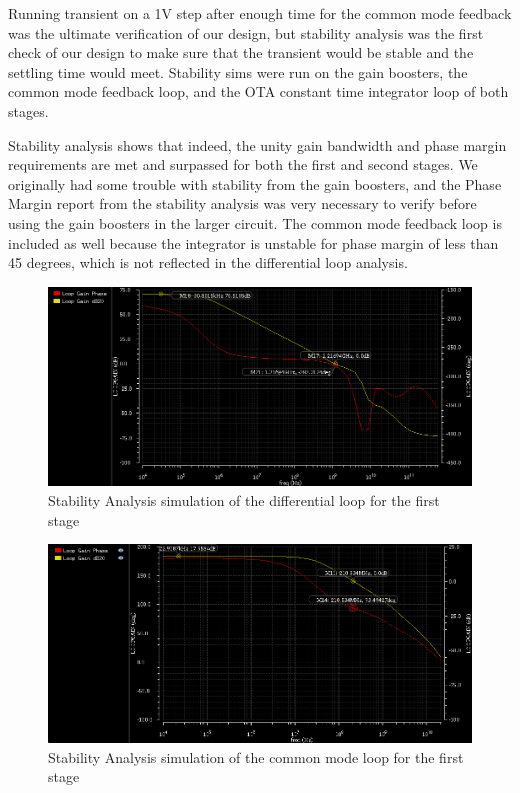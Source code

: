 \documentclass[conference]{IEEEtran}
\begin{document}
Running transient on a 1V step after enough time for the common mode feedback was the ultimate verification of our design, but stability analysis was the first check of our design to make sure that the transient would be stable and the settling time would meet. Stability sims were run on the gain boosters, the common mode feedback loop, and the OTA constant time integrator loop of both stages.

Stability analysis shows that indeed, the unity gain bandwidth and phase margin requirements are met and surpassed for both the first and second stages. We originally had some trouble with stability from the gain boosters, and the Phase Margin report from the stability analysis was very necessary to verify before using the gain boosters in the larger circuit. The common mode feedback loop is included as well because the integrator is unstable for phase margin of less than 45 degrees, which is not reflected in the differential loop analysis.\\


\begin{figure}[h]
\centering
\includegraphics[width=\linewidth]{piktures/st1_diff_ac}
\caption{Stability Analysis simulation of the differential loop for the first stage}
\label{stage1-tran}
\end{figure}

\begin{figure}[h]
\centering
\includegraphics[width=\linewidth]{piktures/st1_cm_ac}
\caption{Stability Analysis simulation of the common mode loop for the first stage}
\label{stage1-tran}
\end{figure}
\end{document}
